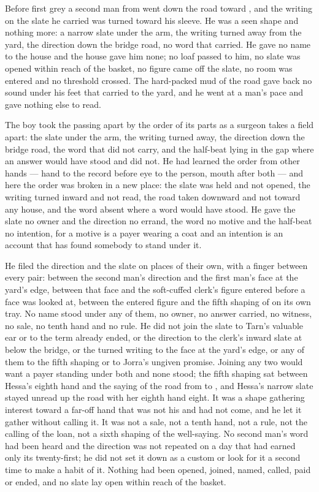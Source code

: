 Before first grey a second man from  went down the road toward , and the writing on the slate he carried was turned toward his sleeve. He was a seen shape and nothing more: a narrow slate under the arm, the writing turned away from the yard, the direction down the bridge road, no word that carried. He gave no name to the house and the house gave him none; no loaf passed to him, no slate was opened within reach of the basket, no figure came off the slate, no room was entered and no threshold crossed. The hard-packed mud of the road gave back no sound under his feet that carried to the yard, and he went at a man's pace and gave nothing else to read.

The boy took the passing apart by the order of its parts as a surgeon takes a field apart: the slate under the arm, the writing turned away, the direction down the bridge road, the word that did not carry, and the half-beat lying in the gap where an answer would have stood and did not. He had learned the order from other hands --- hand to the record before eye to the person, mouth after both --- and here the order was broken in a new place: the slate was held and not opened, the writing turned inward and not read, the road taken downward and not toward any house, and the word absent where a word would have stood. He gave the slate no owner and the direction no errand, the word no motive and the half-beat no intention, for a motive is a payer wearing a coat and an intention is an account that has found somebody to stand under it.

He filed the direction and the slate on places of their own, with a finger between every pair: between the second man's direction and the first man's face at the yard's edge, between that face and the soft-cuffed clerk's figure entered before a face was looked at, between the entered figure and the fifth shaping of  on its own tray. No name stood under any of them, no owner, no answer carried, no witness, no sale, no tenth hand and no rule. He did not join the slate to Tarn's valuable ear or to the term already ended, or the direction to the clerk's inward slate at  below the bridge, or the turned writing to the face at the yard's edge, or any of them to the fifth shaping or to Jorra's ungiven promise. Joining any two would want a payer standing under both and none stood; the fifth shaping sat between Hessa's eighth hand and the saying of the road from  to , and Hessa's narrow slate stayed unread up the road with her eighth hand eight. It was a shape gathering interest toward a far-off hand that was not his and had not come, and he let it gather without calling it. It was not a sale, not a tenth hand, not a rule, not the calling of the loan, not a sixth shaping of the well-saying. No second man's word had been heard and the direction was not repeated on a day that had earned only its twenty-first; he did not set it down as a custom or look for it a second time to make a habit of it. Nothing had been opened, joined, named, called, paid or ended, and no slate lay open within reach of the basket.

